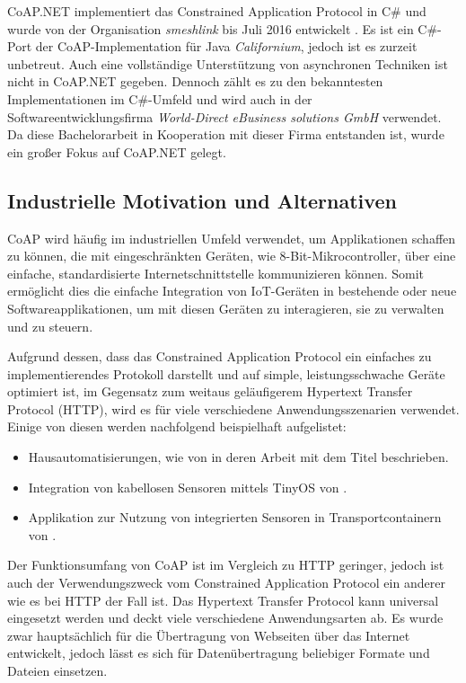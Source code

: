 CoAP.NET implementiert das Constrained Application Protocol in C\# und wurde von der Organisation \textit{smeshlink} bis Juli 2016 entwickelt \autocite{coapnet}. Es ist ein C\#-Port der CoAP-Implementation für Java \textit{Californium}, jedoch ist es zurzeit unbetreut. Auch eine vollständige Unterstützung von asynchronen Techniken ist nicht in CoAP.NET gegeben. Dennoch zählt es zu den bekanntesten Implementationen im C\#-Umfeld und wird auch in der Softwareentwicklungsfirma \textit{World-Direct eBusiness solutions GmbH} verwendet. Da diese Bachelorarbeit in Kooperation mit dieser Firma entstanden ist, wurde ein großer Fokus auf CoAP.NET gelegt.

\subsection{Industrielle Motivation und Alternativen}
\label{subsec:industrielle-motivation-und-alternativen}

CoAP wird häufig im industriellen Umfeld verwendet, um Applikationen schaffen zu können, die mit eingeschränkten Geräten, wie 8-Bit-Mikrocontroller, über eine einfache, standardisierte Internetschnittstelle kommunizieren können. Somit ermöglicht dies die einfache Integration von IoT-Geräten in bestehende oder neue Softwareapplikationen, um mit diesen Geräten zu interagieren, sie zu verwalten und zu steuern.

Aufgrund dessen, dass das Constrained Application Protocol ein einfaches zu implementierendes Protokoll darstellt und auf simple, leistungsschwache Geräte optimiert ist, im Gegensatz zum weitaus geläufigerem Hypertext Transfer Protocol (HTTP), wird es für viele verschiedene Anwendungsszenarien verwendet. Einige von diesen werden nachfolgend beispielhaft aufgelistet:
\begin{itemize}
    \item Hausautomatisierungen, wie von \citeauthor{HomeAutomationUsingCoAP} in deren Arbeit mit dem Titel  \autocite{HomeAutomationUsingCoAP} beschrieben.
    \item Integration von kabellosen Sensoren mittels TinyOS von \citeauthor{TinyCoAP} \autocite{TinyCoAP}.
    \item Applikation zur Nutzung von integrierten Sensoren in Transportcontainern von \citeauthor{TransportLogisticUsingCoAP} \autocite{TransportLogisticUsingCoAP}.
\end{itemize}

Der Funktionsumfang von CoAP ist im Vergleich zu HTTP geringer, jedoch ist auch der Verwendungszweck vom Constrained Application Protocol ein anderer wie es bei HTTP der Fall ist. Das Hypertext Transfer Protocol kann universal eingesetzt werden und deckt viele verschiedene Anwendungsarten ab. Es wurde zwar hauptsächlich für die Übertragung von Webseiten über das Internet entwickelt, jedoch lässt es sich für Datenübertragung beliebiger Formate und Dateien einsetzen.

